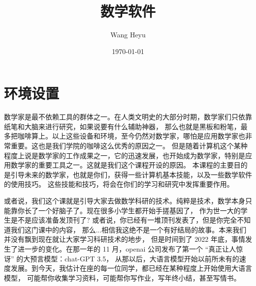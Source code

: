 \documentclass{ctexbook}
\title{数学软件}
\author{Wang Heyu}
\date{\today}
\numberwithin{theorem}{chapter}
\begin{document}
  
\maketitle  

\chapter{环境设置}

数学家是最不依赖工具的群体之一。在人类文明史的大部分时期，数学家们只依靠纸笔和大脑来进行研究，如果说要有什么辅助神器，
那么也就是黑板和粉笔，最多把咖啡算上。以上这些设备和环境，至今仍然对数学家，哪怕是应用数学家也非常重要。这也是我们学院的咖啡这么优秀的原因之一。
但是随着计算机这个某种程度上说是数学家的工作成果之一，它的迅速发展，也开始成为数学家，特别是应用数学家的重要工具之一。这就是我们这个课程开设的原因。
本课程的主要目的是引导未来的数学家，也就是你们，获得一些计算机基本技能，以及一些数学软件的使用技巧。
这些技能和技巧，将会在你们的学习和研究中发挥重要作用。

或者说，我们这个课就是引导大家去做数学科研的技术。纯粹是技术，数学本身只能靠你长了一个好脑子了。现在很多小学生都开始手搓基因了，
作为世一大的学生是不是应该准备发顶刊了? 或者说，你已经有一堆顶刊发表了，但是你完全不知道我们这门课中的内容，
那么...相信我这绝不是一个有好结局的故事。本来我们并没有飘到现在就让大家学习科研技术的地步，
但是时间到了 2022 年底，事情发生了进一步的变化。在那一年的 11 月，openai 公司发布了第一个 ``真正让人惊讶'' 的大预言模型：chat-GPT 3.5，
从那以后，大语言模型开始以前所未有的速度发展。到今天，我估计在座的每一位同学，都已经在某种程度上开始使用大语言模型，
可能帮你收集学习资料，可能帮你写作业，写年终小结，甚至写情书。
\end{document}
